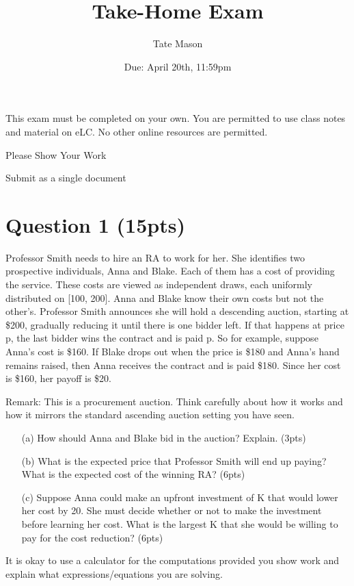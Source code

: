 \documentclass[10pt,a4paper]{article}
\begin{document}
\title{Take-Home Exam}
\author{Tate Mason}
\date{Due: April 20th, 11:59pm}
\maketitle

\noindent This exam must be completed on your own. You are permitted to use class notes and material on eLC. No other online resources are permitted.

\noindent Please Show Your Work

\noindent Submit as a single document

\section*{Question 1 (15pts)}
  Professor Smith needs to hire an RA to work for her. She identifies two prospective individuals, Anna and Blake. Each of them has a cost of providing the service. These costs are viewed as independent draws, each uniformly distributed on [100, 200]. Anna and Blake know their own costs but not the other's. Professor Smith announces she will hold a descending auction, starting at \$200, gradually reducing it until there is one bidder left. If that happens at price p, the last bidder wins the contract and is paid p. So for example, suppose Anna's cost is \$160. If Blake drops out when the price is \$180 and Anna's hand remains raised, then Anna receives the contract and is paid \$180. Since her cost is \$160, her payoff is \$20.

  Remark: This is a procurement auction. Think carefully about how it works and how it mirrors the standard ascending auction setting you have seen.

  \begin{enumerate}
      \item[(a)] How should Anna and Blake bid in the auction? Explain. (3pts)
      \item[(b)] What is the expected price that Professor Smith will end up paying? What is the expected cost of the winning RA? (6pts)
      \item[(c)] Suppose Anna could make an upfront investment of K that would lower her cost by 20. She must decide whether or not to make the investment before learning her cost. What is the largest K that she would be willing to pay for the cost reduction? (6pts)
  \end{enumerate}

  It is okay to use a calculator for the computations provided you show work and explain what expressions/equations you are solving.
\end{document}
